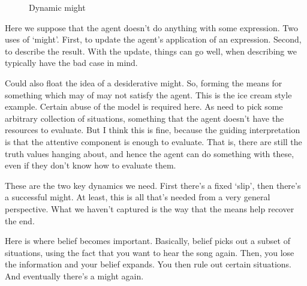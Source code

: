 \documentclass[10pt]{article}
\begin{document}
\begin{figure}[!ht]
  \caption{Dynamic might}
\end{figure}

Here we suppose that the agent doesn't do anything with some expression.
Two uses of `might'.
First, to update the agent's application of an expression.
Second, to describe the result.
With the update, things can go well, when describing we typically have the bad case in mind.

Could also float the idea of a desiderative might.
So, forming the means for something which may of may not satisfy the agent.
This is the ice cream style example.
Certain abuse of the model is required here.
As need to pick some arbitrary collection of situations, something that the agent doesn't have the resources to evaluate.
But I think this is fine, because the guiding interpretation is that the attentive component is enough to evaluate.
That is, there are still the truth values hanging about, and hence the agent can do something with these, even if they don't know how to evaluate them.




These are the two key dynamics we need.
First there's a fixed `slip', then there's a successful might.
At least, this is all that's needed from a very general perspective.
What we haven't captured is the way that the means help recover the end.

Here is where belief becomes important.
Basically, belief picks out a subset of situations, using the fact that you want to hear the song again.
Then, you lose the information and your belief expands.
You then rule out certain situations.
And eventually there's a might again.
\end{document}
